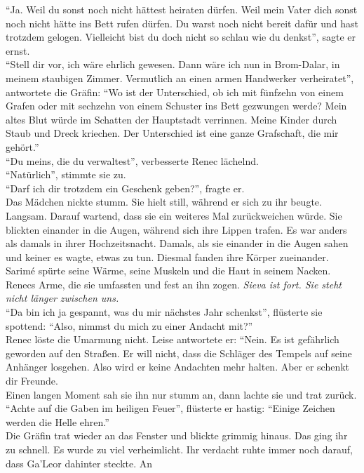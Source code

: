 ``Ja. Weil du sonst noch nicht hättest heiraten dürfen. Weil mein Vater dich sonst noch nicht hätte 
ins Bett rufen dürfen. Du warst noch nicht bereit dafür und hast trotzdem gelogen. Vielleicht bist 
du doch nicht so schlau wie du denkst'', sagte er ernst.\\
``Stell dir vor, ich wäre ehrlich gewesen. Dann wäre ich nun in Brom-Dalar, in meinem staubigen 
Zimmer. Vermutlich an einen armen Handwerker verheiratet'', antwortete die Gräfin: ``Wo ist der 
Unterschied, ob ich mit fünfzehn von einem Grafen oder mit sechzehn von einem Schuster ins Bett 
gezwungen werde? Mein altes Blut würde im Schatten der Hauptstadt verrinnen. Meine Kinder durch 
Staub und Dreck kriechen. Der Unterschied ist eine ganze Grafschaft, die mir gehört.''\\
``Du meins, die du verwaltest'', verbesserte Renec lächelnd.\\
``Natürlich'', stimmte sie zu.\\
``Darf ich dir trotzdem ein Geschenk geben?'', fragte er.\\
Das Mädchen nickte stumm. Sie hielt still, während er sich zu ihr beugte. Langsam. Darauf 
wartend, dass sie ein weiteres Mal zurückweichen würde. Sie blickten einander in die Augen, während 
sich ihre Lippen trafen. Es war anders als damals in ihrer Hochzeitsnacht. Damals, als sie 
einander in die Augen sahen und keiner es wagte, etwas zu tun. Diesmal fanden ihre Körper 
zueinander. Sarimé spürte seine Wärme, seine Muskeln und die Haut in seinem Nacken. Renecs Arme, 
die sie umfassten und fest an ihn zogen. \textit{Sieva ist fort. Sie steht nicht länger zwischen 
uns.}\\
``Da bin ich ja gespannt, was du mir nächstes Jahr schenkst'', flüsterte sie spottend: 
``Also, nimmst du mich zu einer Andacht mit?''\\
Renec löste die Umarmung nicht. Leise antwortete er: ``Nein. Es ist gefährlich geworden auf den 
Straßen. Er will nicht, dass die Schläger des Tempels auf seine Anhänger losgehen. Also 
wird er keine Andachten mehr halten. Aber er schenkt dir Freunde.\\
Einen langen Moment sah sie ihn nur stumm an, dann lachte sie und trat zurück.\\
``Achte auf die Gaben im heiligen Feuer'', flüsterte er hastig: ``Einige Zeichen werden die Helle 
ehren.''\\
Die Gräfin trat wieder an das Fenster und blickte grimmig hinaus. Das ging ihr zu schnell. Es wurde 
zu viel verheimlicht. Ihr verdacht ruhte immer noch darauf, dass Ga'Leor dahinter steckte. An 
